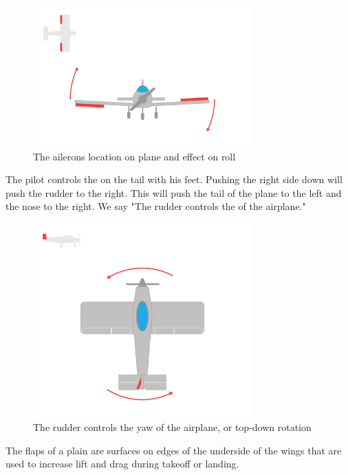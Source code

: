 \begin{figure}[htbp]
    \centering
    \includegraphics[width=0.75\textwidth]{ailerons.png}
    \caption{The ailerons location on plane and effect on roll}
    \label{fig:ailerons}
\end{figure}


The pilot controls the  on the tail with his feet. Pushing the right side down will push the rudder to the right.  This will push the tail of the plane to the left and the 
nose to the right. We say "The rudder controls the  of the airplane."

\begin{figure}[htbp]
    \centering
    \includegraphics[width=0.75\textwidth]{rudder.png}
    \caption{The rudder controls the yaw of the airplane, or top-down rotation}
    \label{fig:rudderYaw}
\end{figure}
    
The flaps of a plain are surfaces on edges of the underside of the wings that are used to increase lift and drag during takeoff or landing.

